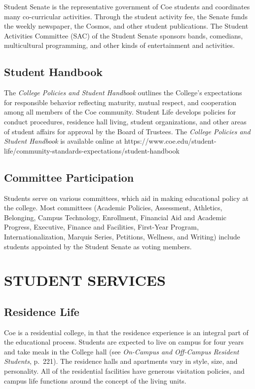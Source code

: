 \documentclass[
  letterpaper,
]{scrbook}
\begin{document}
Student Senate is the representative government of Coe students and
coordinates many co-curricular activities. Through the student activity
fee, the Senate funds the weekly newspaper, the Cosmos, and other
student publications. The Student Activities Committee (SAC) of the
Student Senate sponsors bands, comedians, multicultural programming, and
other kinds of entertainment and activities.

\section{Student Handbook}\label{student-handbook}

The \emph{College Policies and Student Handbook} outlines the College's
expectations for responsible behavior reflecting maturity, mutual
respect, and cooperation among all members of the Coe community. Student
Life develops policies for conduct procedures, residence hall living,
student organizations, and other areas of student affairs for approval
by the Board of Trustees. The \emph{College Policies and Student
Handbook} is available online at
https://www.coe.edu/student-life/community-standards-expectations/student-handbook

\section{Committee Participation}\label{committee-participation}

Students serve on various committees, which aid in making educational
policy at the college. Most committees (Academic Policies, Assessment,
Athletics, Belonging, Campus Technology, Enrollment, Financial Aid and
Academic Progress, Executive, Finance and Facilities, First-Year
Program, Internationalization, Marquis Series, Petitions, Wellness, and
Writing) include students appointed by the Student Senate as voting
members.

\chapter{STUDENT SERVICES}\label{student-services}

\section{Residence Life}\label{residence-life}

Coe is a residential college, in that the residence experience is an
integral part of the educational process. Students are expected to live
on campus for four years and take meals in the College hall (see
\emph{On-Campus and Off-Campus Resident Students}, p.~221). The
residence halls and apartments vary in style, size, and personality. All
of the residential facilities have generous visitation policies, and
campus life functions around the concept of the living units.
\end{document}
